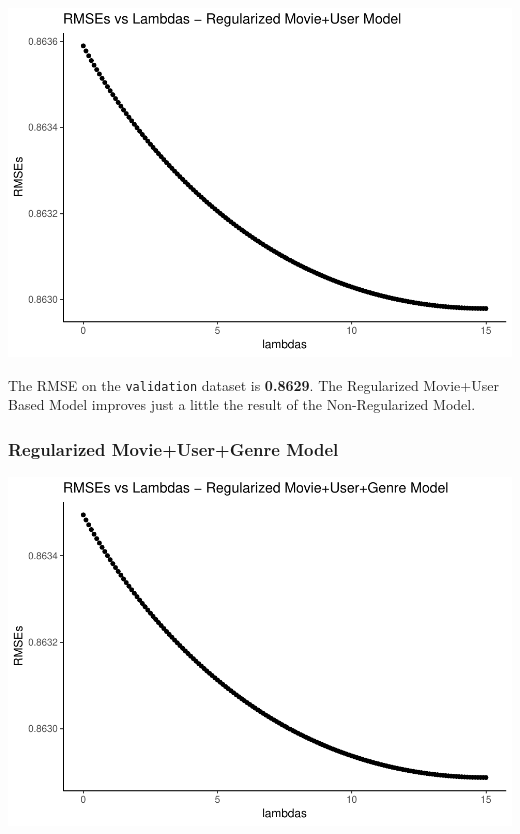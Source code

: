 \documentclass[]{article}
\begin{document}
\begin{center}\includegraphics{MovieLens_Project_Report_files/figure-latex/unnamed-chunk-38-1} \end{center}

The RMSE on the \texttt{validation} dataset is \textbf{0.8629}. The
Regularized Movie+User Based Model improves just a little the result of
the Non-Regularized Model.

\hypertarget{regularized-movieusergenre-model}{%
\subsubsection{Regularized Movie+User+Genre
Model}\label{regularized-movieusergenre-model}}

\begin{center}\includegraphics{MovieLens_Project_Report_files/figure-latex/unnamed-chunk-39-1} \end{center}
\end{document}
